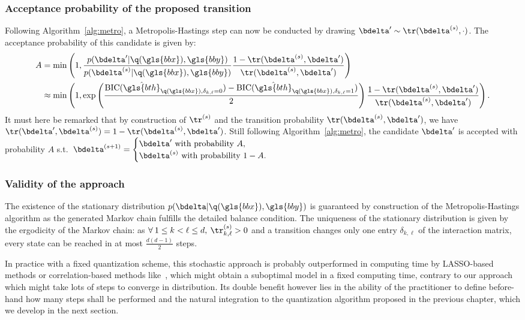 \subsubsection{Acceptance probability of the proposed transition}


Following Algorithm~\eqref{alg:metro}, a Metropolis-Hastings step can now be conducted by drawing $\bdelta' \sim \tr(\bdelta^{(s)},\cdot)$. The acceptance probability of this candidate is given by:
\begin{align*}
A & = \min \left( 1, \frac{p(\bdelta' | \q(\gls{bbx}), \gls{bby})}{p(\bdelta^{(s)} | \q(\gls{bbx}), \gls{bby})} \frac{1-\tr(\bdelta^{(s)},\bdelta')}{\tr(\bdelta^{(s)},\bdelta')} \right) \\
& \approx \min \left( 1, \exp \left( \frac{\text{BIC}(\hat{\gls{bth}}_{\q(\gls{bbx}),\delta_{k,\ell}=0}) - \text{BIC}(\hat{\gls{bth}}_{\q(\gls{bbx}),\delta_{k,\ell}=1})}{2} \right) \frac{1-\tr(\bdelta^{(s)},\bdelta')}{\tr(\bdelta^{(s)},\bdelta')} \right).
\end{align*}
It must here be remarked that by construction of $\tr^{(s)}$ and the transition probability $\tr(\bdelta^{(s)},\bdelta')$, we have $\tr(\bdelta',\bdelta^{(s)}) = 1 - \tr(\bdelta^{(s)},\bdelta')$. Still following Algorithm~\eqref{alg:metro}, the candidate $\bdelta'$ is accepted with probability $A$ s.t.\ $\bdelta^{(s+1)} = \begin{cases} \bdelta' \text{ with probability } A, \\ \bdelta^{(s)} \text{ with probability } 1-A. \end{cases}$

\subsubsection{Validity of the approach}


The existence of the stationary distribution $p(\bdelta | \q(\gls{bbx}),\gls{bby})$ is guaranteed by construction of the Metropolis-Hastings algorithm as the generated Markov chain fulfills the detailed balance condition. The uniqueness of the stationary distribution is given by the ergodicity of the Markov chain: as $\forall \: 1 \leq  k < \ell \leq d, \: \tr_{k,\ell}^{(s)} > 0$ and a transition changes only one entry $\delta_{k,\ell}$ of the interaction matrix, every state can be reached in at most $\frac{d(d-1)}{2}$ steps.

In practice with a fixed quantization scheme, this stochastic approach is probably outperformed in computing time by LASSO-based methods or correlation-based methods like~\cite{simon}, which might obtain a suboptimal model in a fixed computing time, contrary to our approach which might take lots of steps to converge in distribution. Its double benefit however lies in the ability of the practitioner to define before-hand how many steps shall be performed and the natural integration to the quantization algorithm proposed in the previous chapter, which we develop in the next section.

